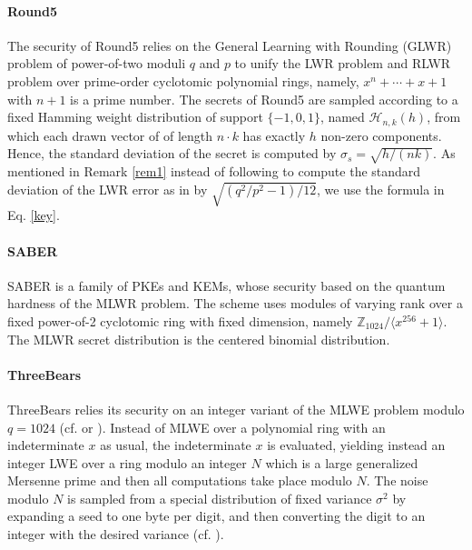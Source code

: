 \documentclass{cta-author}
\begin{document}
\paragraph{Round5 \cite{BBGM+19}} The security of Round5 relies on the General Learning with Rounding (GLWR) problem of power-of-two moduli $q$ and $p$ to unify the LWR problem and RLWR problem over prime-order cyclotomic polynomial rings, namely, $x^n+ \cdots +x+1$ with $n+1$ is a prime number. The secrets of Round5 are sampled according to a fixed Hamming weight distribution of support $\{-1, 0, 1\}$, named $\mathcal{H}_{n,k}(h)$, from which each drawn vector of of length $n\cdot k$ has exactly $h$ non-zero components. Hence, the standard deviation of the secret is computed by $\sigma_s=\sqrt{h/(nk)}.$ As mentioned in Remark \ref{rem1} instead of following \cite{Ngu18} to compute the standard deviation of the LWR error as in \cite[Section 5]{ACD+18} by $\sqrt{(q^2/p^2-1)/12}$, we use the formula in Eq. \eqref{key}.
\paragraph{SABER \cite{DKRV19}}

SABER is a family of PKEs and KEMs, whose security based on the quantum hardness of the MLWR problem. The scheme uses modules of varying rank over a fixed power-of-2 cyclotomic ring with fixed dimension, namely $\mathbb{Z}_{1024}/ \langle x^{256}+1 \rangle$. The MLWR secret distribution is the centered binomial distribution.





\paragraph{ThreeBears \cite{Ham19}} 

ThreeBears relies its security on an integer variant of the MLWE problem modulo $q=1024$ (cf. \cite{Chu17} or \cite[Section 4.1]{Ham19}). Instead of MLWE over a polynomial ring with an indeterminate $x$ as usual, the indeterminate $x$ is evaluated, yielding instead an integer LWE over a ring modulo an integer $N$ which is a large generalized Mersenne prime and then all computations take
place modulo $N$.  The noise modulo $N$ is sampled from a special distribution of fixed variance $\sigma^2$ by expanding a seed to one byte per digit, and then converting the digit to an integer with the desired variance (cf. \cite[Subsection 2.4.2]{Ham19}).
\end{document}
